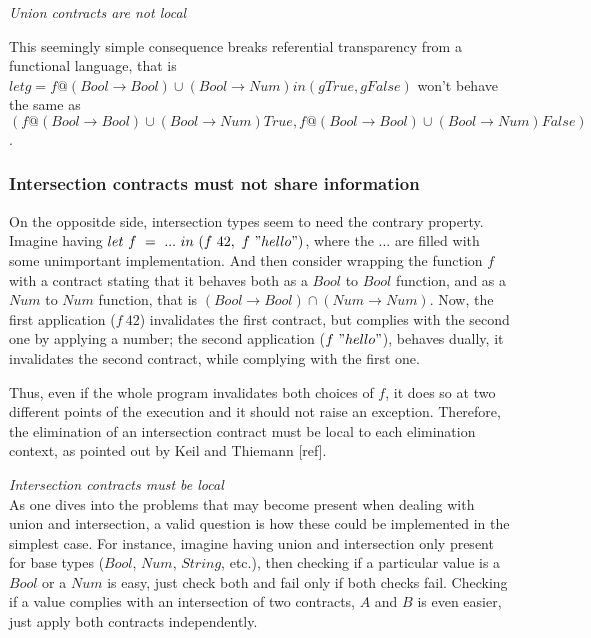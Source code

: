 \textit{Union contracts are not local}


This seemingly simple consequence breaks referential transparency from a functional language, that is
$let g = f@(Bool \rightarrow Bool) \cup (Bool \rightarrow Num) in (g True, g False)$
won't behave the same as 
$(f@(Bool \rightarrow Bool) \cup (Bool \rightarrow Num) True, f@(Bool \rightarrow Bool) \cup (Bool \rightarrow Num) False)$.

\subsubsection*{Intersection contracts must not share information}

On the oppositde side, intersection types seem to need the contrary property.
Imagine having $let~f~=~...~in~(f~42,~f~"hello")$, where the $...$ are filled
with some unimportant implementation. And then consider wrapping the function
$f$ with a contract stating that it behaves both as a $Bool$ to $Bool$ function,
and as a $Num$ to $Num$ function, that is $(Bool \rightarrow Bool) \cap (Num \rightarrow Num)$.
Now, the first application ($f~42$) invalidates the first contract, but complies with the second
one by applying a number; the second application ($f~"hello"$), behaves dually,
it invalidates the second contract,
while complying with the first one.

Thus, even if the whole program invalidates both choices of $f$, it does
so at two different points of the execution and it should not raise an exception.
Therefore, the elimination of an intersection contract must be local to each elimination
context, as pointed out by Keil and Thiemann [ref].

\textit{Intersection contracts must be local}\\


As one dives into the problems that may become present when dealing with union and intersection,
a valid question is how these could be implemented in the simplest case. For instance, imagine having
union and intersection only present for base types ($Bool$, $Num$, $String$, etc.), then checking
if a particular value is a $Bool$ or a $Num$ is easy, just check both and fail only if both 
checks fail. Checking if a value complies with an intersection of two contracts, $A$ and $B$ is even
easier, just apply both contracts independently.

